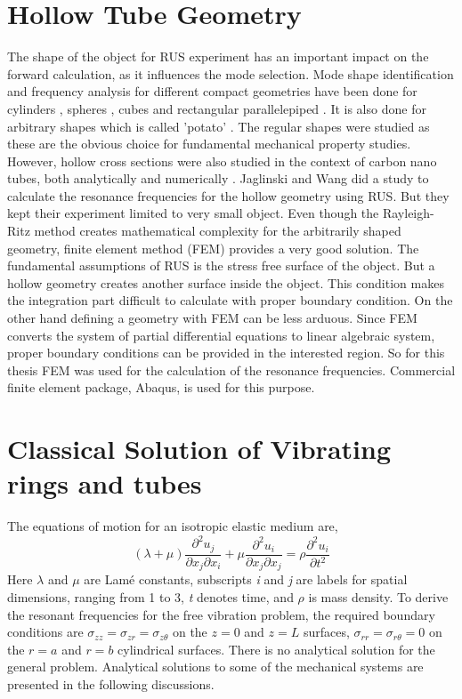 \begin{doublespacing}
\section{Hollow Tube Geometry}
The shape of the object for RUS experiment has an important impact on the forward calculation, as it influences the mode selection. Mode shape identification and frequency analysis for different compact geometries have been done for cylinders \cite{heyliger1993elastic}, spheres \cite{lamb1881vibrations}, cubes \cite{demarest1971cube} and rectangular parallelepiped \cite{visscher1991normal}. It is also done for arbitrary shapes which is called 'potato' \cite{visscher1991normal}. The regular shapes were studied as these are the obvious choice for fundamental mechanical property studies. However, hollow cross sections were also studied in the context of carbon nano tubes, both analytically \cite{mahan2002oscillations} and numerically \cite{li2008acoustic}. Jaglinski and Wang \cite{jaglinski2011use} did a study to calculate the resonance frequencies for the hollow geometry using RUS. But they kept their experiment limited to very small object. Even though the Rayleigh-Ritz method creates mathematical complexity for the arbitrarily shaped geometry, finite element method (FEM) provides a very good solution. The fundamental assumptions of RUS is the stress free surface of the object. But a hollow geometry creates another surface inside the object. This condition makes the integration part difficult to calculate with proper boundary condition. On the other hand defining a geometry with FEM can be less arduous. Since FEM converts the system of partial differential equations to linear algebraic system, proper boundary conditions can be provided in the interested region. So for this thesis FEM was used for the calculation of the resonance frequencies. Commercial finite element package, Abaqus, is used for this purpose.

\newpage
\section{Classical Solution of Vibrating rings and tubes}
The equations of motion for an isotropic elastic medium are, 
\begin{equation}
\label{eq_navier}
(\lambda+\mu)\frac{\partial^2{u_j}}{\partial{x_j}\partial{x_i}} + \mu\frac{\partial^2{u_i}}{\partial{x_j}\partial{x_j}} = \rho \frac{\partial^2{u_i}}{\partial{t}^2}
\end{equation}
Here $\lambda$ and $\mu$ are Lam\'e constants, subscripts \textit{i} and \textit{j} are labels for spatial dimensions, ranging from 1 to 3, \textit{t} denotes time, and $\rho$ is mass density. To derive the resonant frequencies for the free vibration problem, the required boundary conditions are $\sigma_{zz} = \sigma_{zr} = \sigma_{z\theta} $ on the $z=0$ and $z=L$ surfaces, $\sigma_{rr}=\sigma_{r\theta}=0$ on the $r=a$ and $r=b$ cylindrical surfaces. There is no analytical solution for the general problem. Analytical solutions to some of the mechanical systems are presented in the following discussions.




\end{doublespacing}
